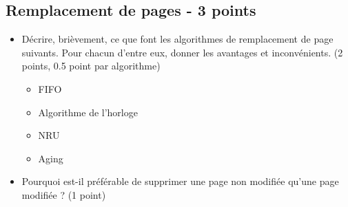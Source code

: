 \subsection{Remplacement de pages - 3 points}
\begin{itemize}
   \item D\'ecrire, bri\`evement, ce que font les algorithmes de remplacement de page suivants. Pour chacun d'entre eux, donner les avantages et inconv\'enients. (2 points, 0.5 point par algorithme)
         \begin{itemize}
            \item FIFO
            \item Algorithme de l'horloge
            \item NRU
            \item Aging
         \end{itemize}
   \item Pourquoi est-il pr\'ef\'erable de supprimer une page non modifi\'ee qu'une page modifi\'ee ? (1 point)
\end{itemize}

